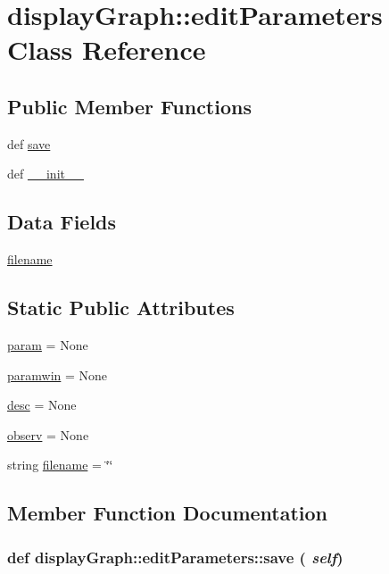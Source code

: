 \hypertarget{classdisplayGraph_1_1editParameters}{
\section{displayGraph::editParameters Class Reference}
\label{classdisplayGraph_1_1editParameters}
}
\subsection*{Public Member Functions}
\begin{CompactItemize}
\item 
def \hyperlink{classdisplayGraph_1_1editParameters_d802e01478d095140cb8d16e56fc3628}{save}
\item 
def \hyperlink{classdisplayGraph_1_1editParameters_acd797ed8c2439a37b473a314f975398}{\_\-\_\-init\_\-\_\-}
\end{CompactItemize}
\subsection*{Data Fields}
\begin{CompactItemize}
\item 
\hyperlink{classdisplayGraph_1_1editParameters_c011e3913dca5cbbf1aebf96b06f41db}{filename}
\end{CompactItemize}
\subsection*{Static Public Attributes}
\begin{CompactItemize}
\item 
\hyperlink{classdisplayGraph_1_1editParameters_e7c15c410a2f1c6b7a8c03b5f6548d40}{param} = None
\item 
\hyperlink{classdisplayGraph_1_1editParameters_a951265766b7426324962b1c195942de}{paramwin} = None
\item 
\hyperlink{classdisplayGraph_1_1editParameters_b69a61340f823451d597e87c5d97c13c}{desc} = None
\item 
\hyperlink{classdisplayGraph_1_1editParameters_3f2fc67ca2dafbc158217ea0de01458d}{observ} = None
\item 
string \hyperlink{classdisplayGraph_1_1editParameters_ec95bc82d4685fae95a2149d4a6c477d}{filename} = \char`\"{}\char`\"{}
\end{CompactItemize}


\subsection{Member Function Documentation}
\hypertarget{classdisplayGraph_1_1editParameters_d802e01478d095140cb8d16e56fc3628}{
\subsubsection{\setlength{\rightskip}{0pt plus 5cm}def displayGraph::editParameters::save ( {\em self})}}
\label{classdisplayGraph_1_1editParameters_d802e01478d095140cb8d16e56fc3628}


